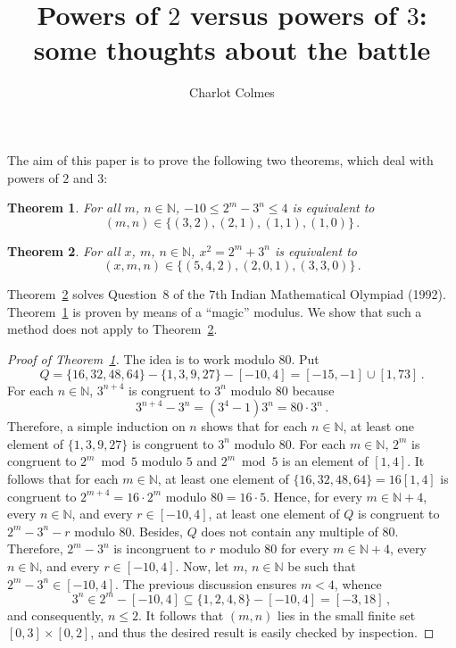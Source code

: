 \documentclass[12pt]{article}
\newcommand{\bN}{\mathbb{N}} %
\newtheorem{theorem}{Theorem}
\theoremstyle{definition}
\begin{document}
 \title{Powers of $2$ versus powers of $3$: some thoughts about the battle}
 \author{Charlot Colmes}
 \maketitle 


 The aim of this paper is to prove the following two theorems, which deal with powers of $2$ and $3$:

   \begin{theorem} \label{thm:2m-moins-3n}
     For all $m$, $n \in \bN$,
     $- 10 \le 2^m - 3^n  \le 4$ is equivalent to
     $$(m, n) \in \{ (3, 2), (2, 1), (1, 1), (1, 0)  \} \, .
     $$
   \end{theorem}

   
   \begin{theorem} \label{thm:IndMO}
     For all $x$, $m$, $n \in \bN$,
     $x^2 = 2^m + 3^n$ is equivalent to
     $$
     (x, m, n) \in \{  (5, 4, 2), (2, 0, 1), (3, 3, 0) \} \, .
     $$
   \end{theorem}

   Theorem~\ref{thm:IndMO} solves Question~$8$ of the $7$th Indian Mathematical Olympiad (1992).
   Theorem~\ref{thm:2m-moins-3n} is proven by means of a ``magic'' modulus.
   We show that such a method does not apply to Theorem~\ref{thm:IndMO}. 
   
   
   \begin{proof}[Proof of Theorem~\ref{thm:2m-moins-3n}]
     The idea is to work modulo $80$.
     Put  
     $$
     Q  = \{ 16, 32, 48, 64 \}  - \{ 1, 3, 9, 27 \}  - [- 10, 4] = [-15, - 1] \cup [1, 73] \,.
     $$
     For each $n \in \bN$,
     $3^{n + 4}$ is congruent to $3^n$ modulo $80$ because 
     $$3^{n + 4} - 3^n =  (3^4 - 1) 3^n = 80 \cdot  3^n \, .
     $$
     Therefore,
     a simple induction on $n$ shows that for each $n \in \bN$,
     at least one element of $\{ 1, 3, 9, 27 \}$ is congruent to $3^n$ modulo $80$.
     For each $m \in \bN$,
     $2^m$ is congruent to $2^m \bmod 5$ modulo $5$ and
     $2^m \bmod 5$ is an element of $[1, 4]$.
     It follows that for each $m \in \bN$,
     at least one element of
     $\{ 16, 32, 48, 64 \} = 16 [1, 4]$ is congruent to $2^{m + 4}  = 16  \cdot 2^m$ modulo $80 = 16 \cdot 5$.
     Hence, for every $m \in \bN + 4$, every $n \in \bN$, and every $r \in [-10, 4]$, 
     at least one element of $Q$ is congruent to $2^m - 3^n - r$ modulo $80$.
     Besides, $Q$ does not contain any multiple of $80$.
     Therefore,
     $2^m - 3^n$ is incongruent to $r$ modulo $80$
     for every $m \in \bN + 4$,
     every $n \in \bN$, and
     every $r \in [- 10, 4]$.
     Now, let $m$, $n \in \bN$ be such that $2^m - 3^n \in [-10, 4]$.
     The previous discussion ensures $m < 4$,
     whence  
     $$
     3^n \in 2^m - [- 10, 4] \subseteq \{ 1, 2, 4, 8 \} - [- 10, 4] = [ -3, 18] \, ,
     $$
     and consequently, $n \le 2$.
     It follows that $(m, n)$ lies in the small finite set $[0, 3] \times [0, 2]$,
     and thus the desired result is easily checked by inspection.
   \end{proof}
\end{document}
